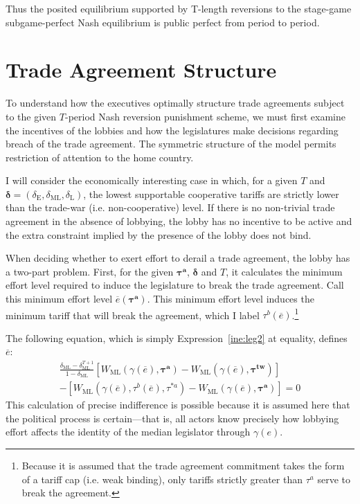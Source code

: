 \documentclass[authoryear, review]{elsarticle}
\newcommand{\ov}{\overline}
\newcommand{\bta}{\bm{\tau^a}}
\newcommand{\ga}{\gamma}
\newcommand{\btw}{\bm{\tau^{tw}}}
\newcommand{\de}{\delta}
\begin{document}
Thus the posited equilibrium supported by T-length reversions to the stage-game subgame-perfect Nash equilibrium is public perfect from period to period.

\section{Trade Agreement Structure}
\label{sec:structure}
To understand how the executives optimally structure trade agreements subject to the given $T$-period Nash reversion punishment scheme, we must first examine the incentives of the lobbies and how the legislatures make decisions regarding breach of the trade agreement. The symmetric structure of the model permits restriction of attention to the home country.

I will consider the economically interesting case in which, for a given $T$ and $\bm{\de}=\left(\de_\text{E},\de_\text{ML},\de_\text{L}\right)$, the lowest supportable cooperative tariffs are strictly lower than the trade-war (i.e. non-cooperative) level. If there is no non-trivial trade agreement in the absence of lobbying, the lobby has no incentive to be active and the extra constraint implied by the presence of the lobby does not bind.

When deciding whether to exert effort to derail a trade agreement, the lobby has a two-part problem. First, for the given $\bta$, $\bm{\de}$ and $T$, it calculates the minimum effort level required to induce the legislature to break the trade agreement. Call this minimum effort level $\ov{e}(\bta)$. This minimum effort level induces the minimum tariff that will break the agreement, which I label $\tau^b(\ov{e})$.\footnote{Because it is assumed that the trade agreement commitment takes the form of a tariff cap (i.e. weak binding), only tariffs strictly greater than $\tau^a$ serve to break the agreement.}

The following equation, which is simply Expression~\ref{ine:leg2} at equality, defines $\ov{e}$:
\begin{multline}
  \frac{\de_\text{ML} - \de_\text{ML}^{T+1}}{1-\de_\text{ML}} \left[W_\text{ML}(\ga(\ov{e}),\bta) - W_\text{ML}(\ga(\ov{e}),\btw) \right] \\
	- \left[ W_\text{ML}(\ga(\ov{e}),\tau^b(\ov{e}),\tau^{*a}) - W_\text{ML}(\ga(\ov{e}),\bta) \right] = 0
  \label{eq:leg2}
\end{multline}
This calculation of precise indifference is possible because it is assumed here that the political process is certain---that is, all actors know precisely how lobbying effort affects the identity of the median legislator through $\ga(e)$.
\end{document}
